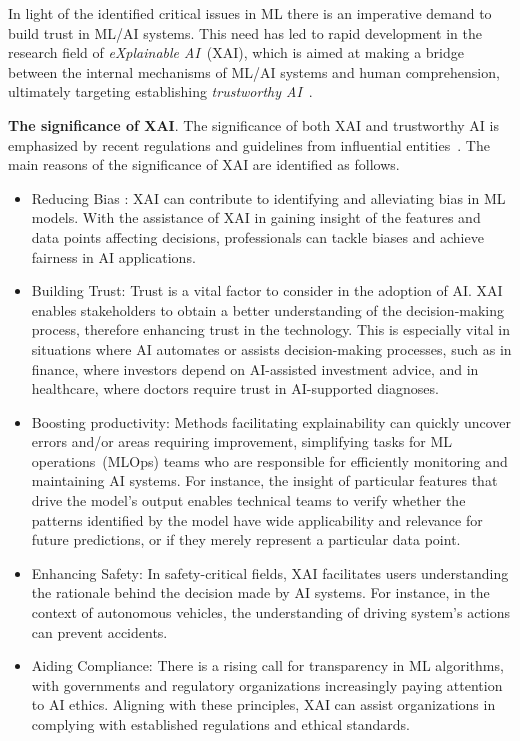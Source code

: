 In light of the identified critical issues in ML
there is an imperative demand
to build trust in ML/AI systems.
%
This need has led to rapid development in the research field of \emph{eXplainable AI}~(XAI),
which is aimed at making a bridge between the internal mechanisms of ML/AI systems and human comprehension, 
ultimately targeting establishing \emph{trustworthy AI}~\cite{ms-rw22}.

\textbf{The significance of XAI}.
%
The significance of both XAI and trustworthy AI is emphasized by 
recent regulations and guidelines from influential entities~\cite{darpa-xai16,hlegai19,hlegai20,eucoord21,euaiact21,oecd21,unesco21,ms-rw22}.
%
The main reasons of the significance of XAI are identified 
as follows.

\begin{itemize}
	\item Reducing Bias :
		XAI can contribute to identifying and alleviating bias
		in ML models.
		With the assistance of XAI in gaining insight of the features and data points
		affecting decisions, professionals can tackle biases and achieve fairness in AI applications.

	\item Building Trust:
		Trust is a vital factor to consider in the adoption of AI.
		XAI enables stakeholders to obtain a better understanding of the decision-making process, 
		therefore enhancing trust in the technology.
		This is especially vital in situations where AI automates or assists decision-making processes, 
		such as in finance, where investors depend on AI-assisted investment advice, 
		and in healthcare, where doctors require trust in AI-supported diagnoses.
	\item Boosting productivity:
		Methods facilitating explainability can quickly uncover errors and/or areas
		requiring improvement, simplifying tasks for ML operations~(ML\-Ops) teams who are responsible for 
		efficiently monitoring and maintaining AI systems.
		For instance, the insight of particular features that drive the model's output 
		enables technical teams to verify whether the patterns identified by the model 
		have wide applicability and relevance for future predictions,
		or if they merely represent a particular data point.
	\item Enhancing Safety:
		In safety-critical fields, XAI facilitates users
		understanding the rationale behind the decision made by
		AI systems.
		For instance, in the context of autonomous vehicles,
		the understanding of driving system's actions can
		prevent accidents.
	\item Aiding Compliance:
		There is a rising call for transparency in ML algorithms,
		with governments and regulatory organizations increasingly paying 
		attention to AI ethics.
		Aligning with these principles, XAI can assist organizations
		in complying with established regulations and ethical standards.
\end{itemize}

